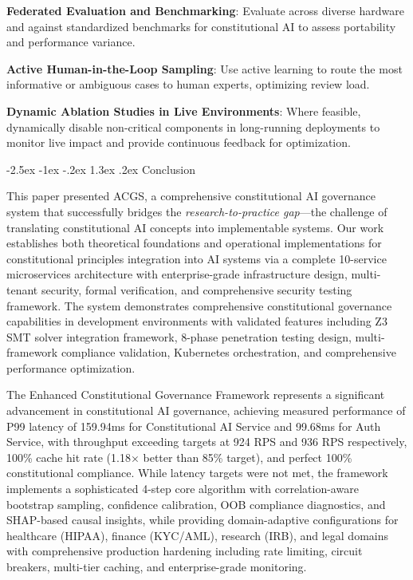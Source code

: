 \documentclass[manuscript,screen,9pt]{acmart}
\makeatletter
\renewcommand\section{\@startsection{section}{1}{\z@}%
  {-2.5ex \@plus -1ex \@minus -.2ex}%
  {1.3ex \@plus.2ex}%
  {\normalfont\Large\bfseries}}
\makeatother
\begin{document}
\noindent\textbf{Federated Evaluation and Benchmarking}: Evaluate across diverse hardware and against standardized benchmarks for constitutional AI to assess portability and performance variance.

\noindent\textbf{Active Human-in-the-Loop Sampling}: Use active learning to route the most informative or ambiguous cases to human experts, optimizing review load.

\noindent\textbf{Dynamic Ablation Studies in Live Environments}: Where feasible, dynamically disable non-critical components in long-running deployments to monitor live impact and provide continuous feedback for optimization.


\section{Conclusion}
\label{sec:conclusion}

This paper presented ACGS, a comprehensive constitutional AI governance system that successfully bridges the \textit{research-to-practice gap}—the challenge of translating constitutional AI concepts into implementable systems. Our work establishes both theoretical foundations and operational implementations for constitutional principles integration into AI systems via a complete 10-service microservices architecture with enterprise-grade infrastructure design, multi-tenant security, formal verification, and comprehensive security testing framework. The system demonstrates comprehensive constitutional governance capabilities in development environments with validated features including Z3 SMT solver integration framework, 8-phase penetration testing design, multi-framework compliance validation, Kubernetes orchestration, and comprehensive performance optimization.

The Enhanced Constitutional Governance Framework represents a significant advancement in constitutional AI governance, achieving measured performance of P99 latency of 159.94ms for Constitutional AI Service and 99.68ms for Auth Service, with throughput exceeding targets at 924 RPS and 936 RPS respectively, 100\% cache hit rate (1.18× better than 85\% target), and perfect 100\% constitutional compliance. While latency targets were not met, the framework implements a sophisticated 4-step core algorithm with correlation-aware bootstrap sampling, confidence calibration, OOB compliance diagnostics, and SHAP-based causal insights, while providing domain-adaptive configurations for healthcare (HIPAA), finance (KYC/AML), research (IRB), and legal domains with comprehensive production hardening including rate limiting, circuit breakers, multi-tier caching, and enterprise-grade monitoring.
\end{document}

